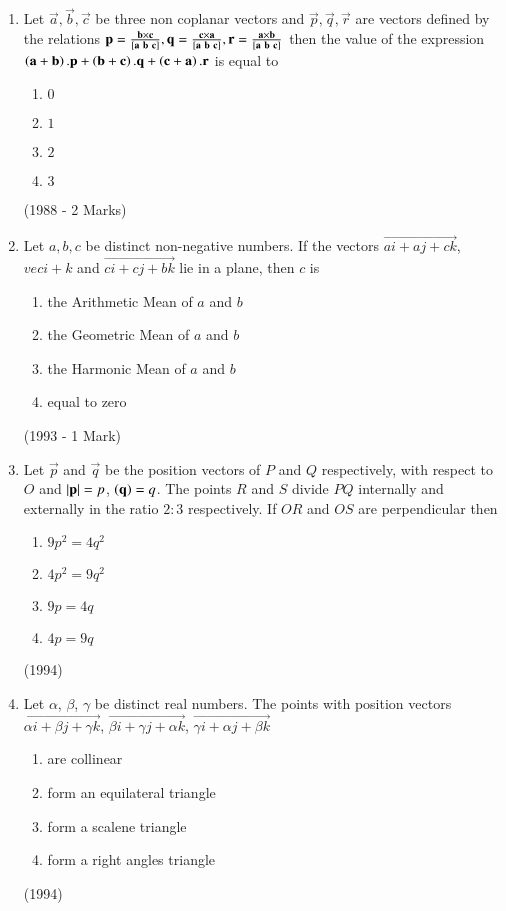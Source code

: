 \documentclass[journal,12pt,twocolumn]{IEEEtran}
\theoremstyle{remark}
\begin{document}
\begin{enumerate}
\item Let $\vec{a}, \vec{b}, \vec{c}$ be three non coplanar vectors and $\vec{p}, \vec{q},\vec{r}$ are vectors defined by the relations $\vec{p}=\frac{\vec{b}\times\vec{c}}{\sbrak{\vec{a}\ \vec{b}\ \vec{c}}}, \vec{q}=\frac{\vec{c}\times\vec{a}}{\sbrak{\vec{a}\ \vec{b}\ \vec{c}}},\vec{r}=\frac{\vec{a}\times\vec{b}}{\sbrak{\vec{a}\ \vec{b}\ \vec{c}}}$ then the value of the expression $\left(\mathbf{a}+\mathbf{b}\right).\mathbf{p}+\left(\mathbf{b}+\mathbf{c}\right).\mathbf{q}+\left(\mathbf{c}+\mathbf{a}\right).\mathbf{r}$ is equal to
\begin{enumerate}
\item $0$
\item $1$
\item $2$
\item $3$
\end{enumerate}
\hfill (1988 - 2 Marks)

\item Let $a, b, c$ be distinct non-negative numbers. If the vectors $\vec{ai + aj + ck}$, $vec{i+k}$ and $\vec{ci+cj+bk}$ lie in a plane, then $c$ is
\begin{enumerate}
\item the Arithmetic Mean of $a$ and $b$
\item the Geometric Mean of $a$ and $b$
\item the Harmonic Mean of $a$ and $b$
\item equal to zero
\end{enumerate}
\hfill (1993 - 1 Mark)

\item Let $\vec{p}$ and $\vec{q}$ be the position vectors of $P$ and $Q$ respectively, with respect to $O$ and $\left\vert\mathbf{p}\right\vert = p$, $\left(\mathbf{q}\right) = q$. The points $R$ and $S$ divide $PQ$ internally and externally in the ratio $2\colon3$ respectively. If $OR$ and $OS$ are perpendicular then
\begin{enumerate}
\item $9p^2 =4q^2$
\item $4p^2 = 9q^2$
\item $9p = 4q$
\item $4p = 9q$
\end{enumerate}
\hfill (1994)

\item Let $\alpha$, $\beta$, $\gamma$ be distinct real numbers. The points with position vectors $\vec{\alpha i+ \beta j + \gamma k}$, $\vec{\beta i+ \gamma j+ \alpha k}$, $\vec{\gamma i + \alpha j + \beta k}$
\begin{enumerate}
\item are collinear
\item form an equilateral triangle
\item form a scalene triangle
\item form a right angles triangle
\end{enumerate}
\hfill (1994)


\end{enumerate}
\end{document}
